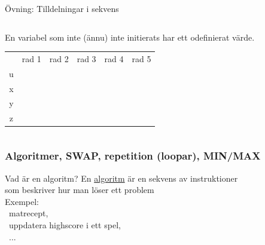 \documentclass{lecturenotes}
\begin{document}
\begin{Slide}{Övning: Tilldelningar i sekvens}\footnotesize
\begin{columns}
\begin{column}{0.6\textwidth}

En variabel som inte (ännu) inte initierats har ett odefinierat värde.
\begin{table}[] 
\centering\scriptsize
\newcommand{\mybox}[1]{\raisebox{-0.5mm}{\framebox(21,14){#1}}\vspace{0.5mm}}
\begin{tabular}{cccccc}
 & rad 1 & rad 2 & rad 3 & rad 4  & rad 5\\ 
u& \mybox{? } &  \mybox{}   &   \mybox{}   & \mybox{} & \mybox{} \\
x& \mybox{? } &  \mybox{}   &   \mybox{}   & \mybox{} & \mybox{} \\
y& \mybox{? } &  \mybox{}   &   \mybox{}   & \mybox{} & \mybox{} \\
z& \mybox{? } &  \mybox{}   &   \mybox{}   & \mybox{} & \mybox{} \\
\end{tabular}
\end{table}

\end{column}
\end{columns}
\end{Slide}

\subsubsection{Algoritmer, SWAP, repetition (loopar), MIN/MAX}

\begin{Slide}{Vad är en algoritm?}
En \href{https://sv.wikipedia.org/wiki/Algoritm}{algoritm} är en sekvens av instruktioner\\ som beskriver hur man löser ett problem \\
\vspace{2em}
Exempel: \\ ~matrecept, \\ ~uppdatera highscore i ett spel, \\ ~...
\end{Slide}
\end{document}
